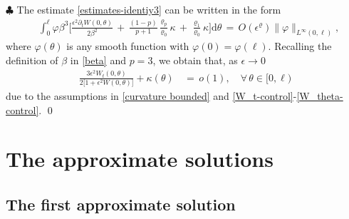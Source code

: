 \documentclass[10pt, reqno]{amsart}
\numberwithin{equation}{section}
\theoremstyle{definition}
\begin{document}
{{\medskip
\noindent $\clubsuit$
 The estimate \eqref{estimates-identiy3} can be written in the form
\begin{align*}
 &
 \int_0^{\ell} \varphi\beta^3
 \Bigg[
 \frac{\epsilon^2\partial_t W(0, \theta)}{2\beta^2}
 \,+\,
 \frac{(1-p)}{p+1}\frac{\varrho_p}{\varrho_0}\kappa
 \,+\,
 \frac{\varrho_1}{\varrho_0}\kappa
 \Bigg] {\mathrm d}\theta
 \,=\,
 O(\epsilon^\varrho)\|\varphi\|_{L^\infty(0,\ell)},
\end{align*}
 where $\varphi(\theta)$ is any smooth function with $\varphi(0)=\varphi(\ell)$.
 Recalling the definition of $\beta$ in \eqref{beta} and $p=3$, we obtain that, as $\epsilon \rightarrow 0$
\begin{align*}
 \frac{3\epsilon^2 W_t(0, \theta)}{2\big[1+\epsilon^2W(0, \theta)\big]} +\kappa (\theta)
 &\,=\,
 o(1),\quad \forall\, \theta\in [0, \ell)
\end{align*}
 due to the assumptions in \eqref{curvature bounded} and \eqref{W_t-control}-\eqref{W_theta-control}.
 \qed





\medskip
\section{The approximate solutions}\label{Section5}

\subsection{ The first approximate solution}\label{Section5.1}
}}
\end{document}
